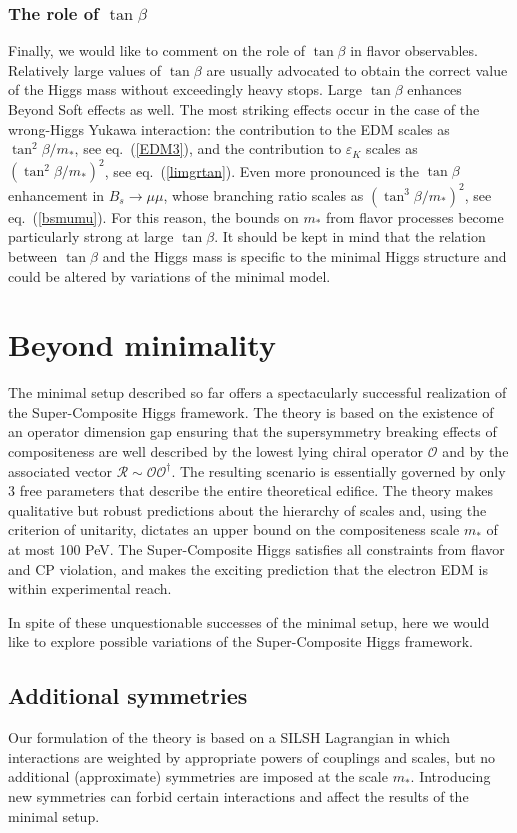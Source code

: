 \documentclass[a4paper,12pt]{article}
\def\eq#1{eq.~(\ref{#1})}
\def\eq#1{eq.~(\ref{#1})}
\def\O{\mathcal{O}}
\def\R{\mathcal{R}}
\def\mst{m_*}
\begin{document}
{{{{\boldmath
\subsubsection*{The role of $\tan\beta$}
\unboldmath
Finally, we would like to comment on the role of $\tan\beta$ in flavor observables. Relatively large values of $\tan\beta$ are usually advocated to obtain the correct value of the Higgs mass without exceedingly heavy stops. Large $\tan\beta$ enhances Beyond Soft effects as well. The most striking effects occur in the case of the wrong-Higgs Yukawa interaction: the contribution to the EDM scales as $\tan^2\beta /\mst$, see \eq{EDM3}, and the contribution to $\varepsilon_K$ scales as $(\tan^2\beta /\mst)^2$, see \eq{limgrtan}. Even more pronounced is the $\tan\beta$ enhancement in $B_s \to \mu \mu$, whose branching ratio scales as $(\tan^3\beta /\mst)^2$, see \eq{bsmumu}. For this reason, the bounds on $\mst$ from flavor processes become particularly strong at large $\tan\beta$. It should be kept in mind that the relation between $\tan\beta$ and the Higgs mass is specific to the minimal Higgs structure and could be altered by variations of the minimal model.

\section{Beyond minimality}
\label{sec:extrasym}

The minimal setup described so far offers a spectacularly successful realization of the Super-Composite Higgs framework.
The theory is based on the existence of an operator dimension gap ensuring that the supersymmetry breaking effects of compositeness are well described by the lowest lying chiral operator $\O$ and by the associated vector $\R\sim \O\O^\dagger$. The resulting scenario is essentially governed by only 3 free parameters that describe the entire theoretical edifice. The theory makes qualitative but robust predictions about the hierarchy of scales and, using the criterion of unitarity, dictates an upper bound on the compositeness scale $\mst$ of at most 100 PeV. The Super-Composite Higgs satisfies all constraints from flavor and CP violation, and makes the exciting prediction that the electron EDM is within experimental reach.

In spite of these unquestionable successes of the minimal setup, here we would like to explore possible variations of the Super-Composite Higgs framework.

\subsection{Additional symmetries}
\label{sec:addit}
Our formulation of the theory is based on a SILSH Lagrangian in which interactions are weighted by appropriate powers of couplings and scales, but no additional (approximate) symmetries are imposed at the scale $\mst$. Introducing new symmetries can forbid certain interactions and affect the results of the minimal setup.

}}}}
\end{document}

